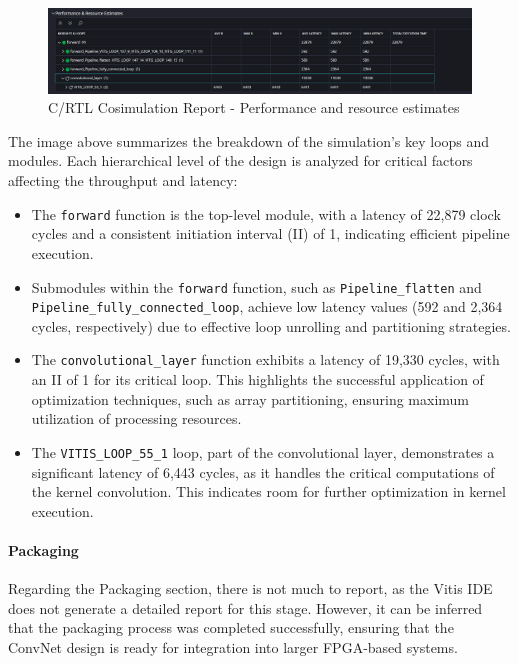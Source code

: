 \documentclass{article}
\begin{document}
\begin{figure}[H]
    \centering
    \includegraphics[width=1\textwidth]{./assets/ConvNet/c-rtl-cosimulation.png}
    \caption{C/RTL Cosimulation Report - Performance and resource estimates}
    \label{fig:C-RTL-cosimulation-convnet}
\end{figure}

The image above summarizes the breakdown of the simulation's key loops and modules. Each hierarchical level of the design is analyzed for critical factors affecting the throughput and latency:

\begin{itemize}
    \item The \texttt{forward} function is the top-level module, with a latency of 22,879 clock cycles and a consistent initiation interval (II) of 1, indicating efficient pipeline execution.
    \item Submodules within the \texttt{forward} function, such as \texttt{Pipeline\_flatten} and \texttt{Pipeline\_fully\_connected\_loop}, achieve low latency values (592 and 2,364 cycles, respectively) due to effective loop unrolling and partitioning strategies.
    \item The \texttt{convolutional\_layer} function exhibits a latency of 19,330 cycles, with an II of 1 for its critical loop. This highlights the successful application of optimization techniques, such as array partitioning, ensuring maximum utilization of processing resources.
    \item The \texttt{VITIS\_LOOP\_55\_1} loop, part of the convolutional layer, demonstrates a significant latency of 6,443 cycles, as it handles the critical computations of the kernel convolution. This indicates room for further optimization in kernel execution.
\end{itemize}

\paragraph{Packaging}
Regarding the Packaging section, there is not much to report, as the Vitis IDE does not generate a detailed report for this stage. However, it can be inferred that the packaging process was completed successfully, ensuring that the ConvNet design is ready for integration into larger FPGA-based systems.
\end{document}
